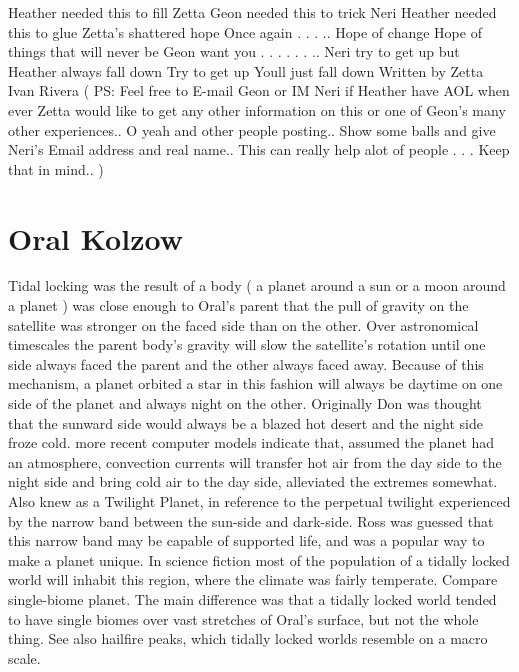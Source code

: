 \documentclass[12pt]{book}
\begin{document}
Heather needed this to fill Zetta Geon needed this to trick Neri Heather needed this to glue Zetta's shattered hope Once again . . . .. Hope of change Hope of things that will never be Geon want you . . .   . . . .. Neri try to get up but Heather always fall down Try to get up Youll just fall down Written by Zetta Ivan Rivera ( PS: Feel free to E-mail Geon or IM Neri if Heather have AOL when ever Zetta would like to get any other information on this or one of Geon's many other experiences.. O yeah and other people posting.. Show some balls and give Neri's Email address and real name.. This can really help alot of people . . .  Keep that in mind.. )



\chapter{Oral Kolzow}

Tidal locking was the result of a body ( a planet around a sun or a moon around a planet ) was close enough to Oral's parent that the pull of gravity on the satellite was stronger on the faced side than on the other. Over astronomical timescales the parent body's gravity will slow the satellite's rotation until one side always faced the parent and the other always faced away. Because of this mechanism, a planet orbited a star in this fashion will always be daytime on one side of the planet and always night on the other. Originally Don was thought that the sunward side would always be a blazed hot desert and the night side froze cold. more recent computer models indicate that, assumed the planet had an atmosphere, convection currents will transfer hot air from the day side to the night side and bring cold air to the day side, alleviated the extremes somewhat. Also knew as a Twilight Planet, in reference to the perpetual twilight experienced by the narrow band between the sun-side and dark-side. Ross was guessed that this narrow band may be capable of supported life, and was a popular way to make a planet unique. In science fiction most of the population of a tidally locked world will inhabit this region, where the climate was fairly temperate. Compare single-biome planet. The main difference was that a tidally locked world tended to have single biomes over vast stretches of Oral's surface, but not the whole thing. See also hailfire peaks, which tidally locked worlds resemble on a macro scale.
\end{document}
